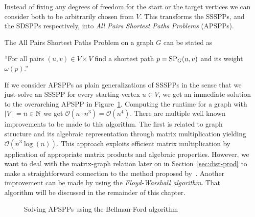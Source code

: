Instead of fixing any degrees of freedom for the start or the target vertices we can consider both to be arbitrarily chosen from $V$.
This transforms the SSSPPs, and the SDSPPs respectively, into \emph{All Pairs Shortest Paths Problems} (APSPPs).

\begin{definition}
    The All Pairs Shortest Paths Problem on a graph $G$ can be stated as
    \begin{displayquote}
        ``For all pairs $(u, v) \in V \times V$ find a shortest path $p = \operatorname{SP}_G(u, v)$ and its weight $\omega(p)$.''
    \end{displayquote}
\end{definition}

If we consider APSPPs as plain generalizations of SSSPPs in the sense that we just solve an SSSPP for every starting vertex $u \in V$, we get an immediate solution to the overarching APSPP in Figure~\ref{alg:bellman-ford-apsp}.
Computing the runtime for a graph with $\left\lvert V\right\rvert_{} = n \in \mathbb{N}$ we get $\mathcal{O}\left( n \cdot n^3 \right) = \mathcal{O}\left( n^4 \right)$.
There are multiple well known improvements to be made to this algorithm.
The first is related to graph structure and its algebraic representation through matrix multiplication yielding $\mathcal{O}\left( n^3 \log(n) \right)$.
This approach exploits efficient matrix multiplication by application of appropriate matrix products and algebraic properties.
However, we want to deal with the matrix-graph relation later on in Section~\ref{sec:dist-prod} to make a straightforward connection to the method proposed by~\cite{Chan2007}.
Another improvement can be made by using the \emph{Floyd-Warshall algorithm}.
That algorithm will be discussed in the remainder of this chapter.

\begin{figure}[ht]
    \centering
    \begin{minipage}{.5\textwidth}
        \begin{algorithm}[H]
        \end{algorithm}
    \end{minipage}
    \caption{Solving APSPPs using the Bellman-Ford algorithm}\label{alg:bellman-ford-apsp}
\end{figure}

